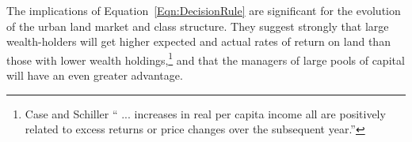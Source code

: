 
%
%

The implications of Equation~\ref{Eqn:DecisionRule} are significant for the evolution of the urban land market and class structure. They suggest strongly that large wealth-holders will get higher expected and actual rates of return on land than those with  lower wealth holdings,\footnote{Case and Schiller ``%
 ... increases in real per capita income all are positively related to excess returns or price changes over the subsequent year.''} and that the managers of large pools of capital will have an even greater advantage. 
 
